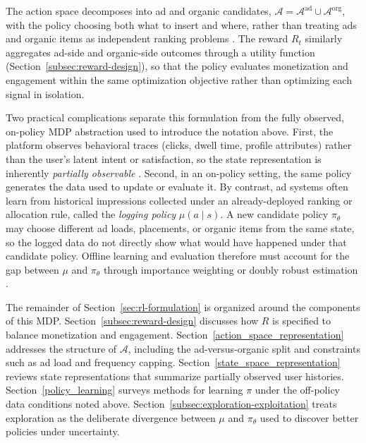 \documentclass[manuscript,review,screen]{acmart}
\begin{document}
The action space decomposes into ad and organic candidates, $\mathcal{A} = \mathcal{A}^{\mathrm{ad}} \cup \mathcal{A}^{\mathrm{org}}$, with the policy choosing both what to insert and where, rather than treating ads and organic items as independent ranking problems \cite{yan2020ads, sagtani2024ad}. The reward $R_t$ similarly aggregates ad-side and organic-side outcomes through a utility function (Section~\ref{subsec:reward-design}), so that the policy evaluates monetization and engagement within the same optimization objective rather than optimizing each signal in isolation.

Two practical complications separate this formulation from the fully observed, on-policy MDP abstraction used to introduce the notation above. First, the platform observes behavioral traces (clicks, dwell time, profile attributes) rather than the user's latent intent or satisfaction, so the state representation is inherently \emph{partially observable} \cite{kaelbling1998planning, lu2016partially}. Second, in an on-policy setting, the same policy generates the data used to update or evaluate it. By contrast, ad systems often learn from historical impressions collected under an already-deployed ranking or allocation rule, called the \emph{logging policy} $\mu(a \mid s)$. A new candidate policy $\pi_\theta$ may choose different ad loads, placements, or organic items from the same state, so the logged data do not directly show what would have happened under that candidate policy. Offline learning and evaluation therefore must account for the gap between $\mu$ and $\pi_\theta$ through importance weighting or doubly robust estimation \cite{swaminathan2015counterfactual, dudik2011doubly, levine2020offline}.

The remainder of Section~\ref{sec:rl-formulation} is organized around the components of this MDP. Section~\ref{subsec:reward-design} discusses how $R$ is specified to balance monetization and engagement. Section~\ref{action_space_representation} addresses the structure of $\mathcal{A}$, including the ad-versus-organic split and constraints such as ad load and frequency capping. Section~\ref{state_space_representation} reviews state representations that summarize partially observed user histories. Section~\ref{policy_learning} surveys methods for learning $\pi$ under the off-policy data conditions noted above. Section~\ref{subsec:exploration-exploitation} treats exploration as the deliberate divergence between $\mu$ and $\pi_\theta$ used to discover better policies under uncertainty.
\end{document}
